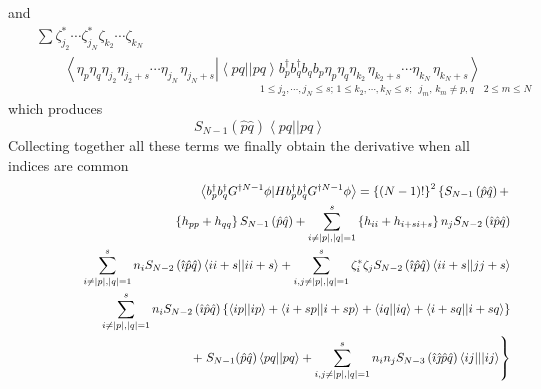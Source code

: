 and%
\begin{eqnarray}
&&\sum \zeta _{j_{2}}^{\ast }\cdots \zeta _{j_{N}}^{\ast }\zeta
_{k_{2}}\cdots \zeta _{k_{N}}  \nonumber \\
&&\qquad \left\langle \eta _{p}\eta _{q}\eta _{j_{2}}\eta _{j_{2}+s}\cdots
\eta _{j_{N}\,}\eta _{j_{N}+s}\left| \left\langle pq||pq\right\rangle
b_{p}^{\dagger }b_{q}^{\dagger }b_{q}b_{p}\eta _{p}\eta _{q}\eta
_{k_{2}\,}\eta _{k_{2}+s}\cdots \eta _{k_{N}\,}\eta _{k_{N}+s}\right.
\right\rangle  \nonumber \\
&&\qquad \qquad \qquad \qquad \qquad \qquad \qquad \qquad _{1\leq
j_{2},\cdots ,j_{N}\leq s;\,1\leq k_{2},\cdots ,k_{N}\leq
s;\,\,\,j_{m},\,k_{m}\neq p,q\quad 2\leq m\leq N}
\end{eqnarray}%
which produces%
\begin{equation}
S_{N-1}(\hat{p}\hat{q})\left\langle pq||pq\right\rangle
\end{equation}%
Collecting together all these terms we finally obtain the derivative when
all indices are common%
\begin{eqnarray}
&&\left\langle b_{p}^{\dagger }b_{q}^{\dagger }G^{\dagger N-1}\phi
|Hb_{p}^{\dagger }b_{q}^{\dagger }G^{\dagger N-1}\phi \right\rangle =\left\{
\left( N-1\right) !\right\} ^{2}\left\{ S_{N-1}\left( \hat{p}\hat{q}\right)
+\right.  \nonumber \\
&&\qquad \qquad \qquad \qquad \qquad \left\{ h_{pp}+h_{qq}\right\}
S_{N-1}\left( \hat{p}\hat{q}\right) +\sum_{i\neq \left| p\right| ,\left|
q\right| =1}^{s}\left\{ h_{ii}+h_{i+si+s}\right\} n_{j}S_{N-2}\left( \hat{%
\imath}\hat{p}\hat{q}\right)  \nonumber \\
&&\left. {}\right. \qquad \qquad \sum_{i\neq \left| p\right| ,\left|
q\right| =1}^{s}n_{i}S_{N-2}\left( \hat{\imath}\hat{p}\hat{q}\right)
\left\langle ii+s||ii+s\right\rangle +\sum_{i,j\neq \left| p\right| ,\left|
q\right| =1}^{s}\zeta _{i}^{\ast }\zeta _{j}S_{N-2}\left( \hat{\imath}\hat{p}%
\hat{q}\right) \left\langle ii+s||jj+s\right\rangle  \nonumber \\
&&\left. {}\right. \qquad \qquad \sum_{i\neq \left| p\right| ,\left|
q\right| =1}^{s}n_{i}S_{N-2}\left( \hat{\imath}\hat{p}\hat{q}\right) \left\{
\left\langle ip||ip\right\rangle +\left\langle i+sp||i+sp\right\rangle
+\left\langle iq||iq\right\rangle +\left\langle i+sq||i+sq\right\rangle
\right\}  \nonumber \\
&&\qquad \qquad \qquad \qquad \qquad \qquad \qquad +\left. S_{N-1}(\hat{p}%
\hat{q})\left\langle pq||pq\right\rangle +\sum_{i,j\neq \left| p\right|
,\left| q\right| =1}^{s}n_{i}n_{j}S_{N-3}\left( \hat{\imath}\hat{\jmath}\hat{%
p}\hat{q}\right) \left\langle ij|||ij\right\rangle \right\}
\end{eqnarray}

